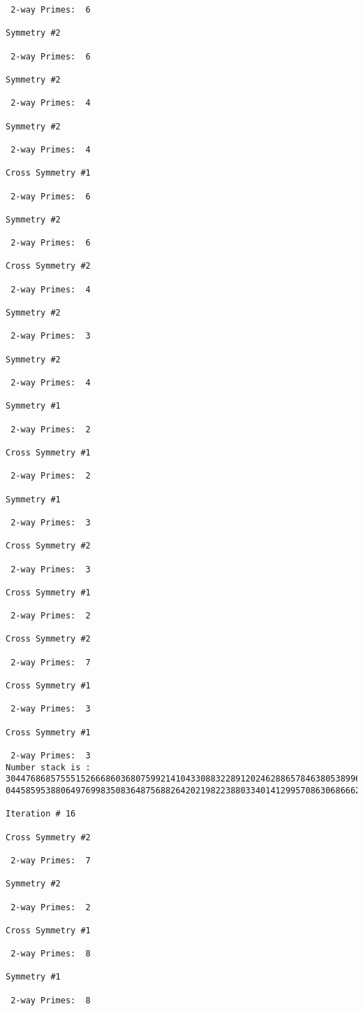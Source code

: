 \begin{verbatim}
 2-way Primes: 	6

Symmetry #2

 2-way Primes: 	6

Symmetry #2

 2-way Primes: 	4

Symmetry #2

 2-way Primes: 	4

Cross Symmetry #1

 2-way Primes: 	6

Symmetry #2

 2-way Primes: 	6

Cross Symmetry #2

 2-way Primes: 	4

Symmetry #2

 2-way Primes: 	3

Symmetry #2

 2-way Primes: 	4

Symmetry #1

 2-way Primes: 	2

Cross Symmetry #1

 2-way Primes: 	2

Symmetry #1

 2-way Primes: 	3

Cross Symmetry #2

 2-way Primes: 	3

Cross Symmetry #1

 2-way Primes: 	2

Cross Symmetry #2

 2-way Primes: 	7

Cross Symmetry #1

 2-way Primes: 	3

Cross Symmetry #1

 2-way Primes: 	3
Number stack is :
30447686857555152666860368075992141043308832289120246288657846380538996794608835958544046240163340857
04458595388064976998350836487568826420219822388033401412995708630686662515557586867440375804336104264

Iteration #	16

Cross Symmetry #2

 2-way Primes: 	7

Symmetry #2

 2-way Primes: 	2

Cross Symmetry #1

 2-way Primes: 	8

Symmetry #1

 2-way Primes: 	8


\end{verbatim}
